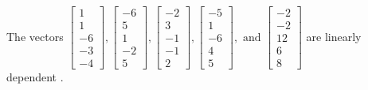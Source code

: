 \begin{exercise}
\begin{exerciseStatement}
  \end{exerciseStatement}
  \begin{exerciseAnswer}
   The vectors \(\left[\begin{array}{r}
1 \\
1 \\
-6 \\
-3 \\
-4
\end{array}\right] , \left[\begin{array}{r}
-6 \\
5 \\
1 \\
-2 \\
5
\end{array}\right] , \left[\begin{array}{r}
-2 \\
3 \\
-1 \\
-1 \\
2
\end{array}\right] , \left[\begin{array}{r}
-5 \\
1 \\
-6 \\
4 \\
5
\end{array}\right] , \text{ and } \left[\begin{array}{r}
-2 \\
-2 \\
12 \\
6 \\
8
\end{array}\right]\) are 
  	 linearly dependent  .
  


  \end{exerciseAnswer}
\end{exercise}